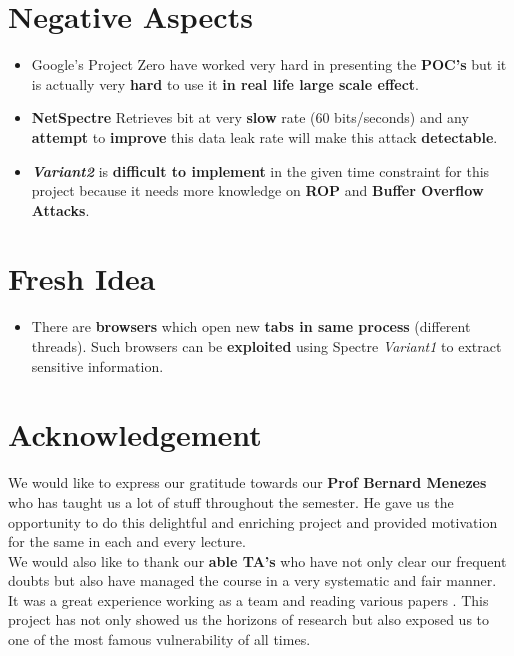 \documentclass[12pt]{article}
\begin{document}
\section{Negative Aspects}
\begin{itemize}
	\item Google's Project Zero\cite{ProjectZero} have worked very hard in presenting the \textbf{POC's} but it is actually very \textbf{hard} to use it \textbf{ in real life large scale effect}.
	\item \textbf{NetSpectre}\cite{NETSPECTRE} Retrieves bit at very \textbf{slow} rate (60 bits/seconds) and any \textbf{attempt} to \textbf{improve} this data leak rate will make this attack \textbf{detectable}.
	\item \textbf{\textit{Variant2}} is \textbf{difficult to implement} in the given time constraint for this project because it needs more knowledge on \textbf{ROP} and \textbf{Buffer Overflow Attacks}.
\end{itemize}
\section{Fresh Idea}
\begin{itemize}
	\item There are \textbf{browsers} which open new \textbf{tabs in same process} (different threads). Such browsers can be \textbf{exploited} using Spectre \textit{Variant1} to extract sensitive information.
\end{itemize}
\section{Acknowledgement}
We would like to express our gratitude towards our \textbf{Prof Bernard Menezes} who has taught us a lot of stuff throughout the semester. He gave us the opportunity to do this delightful and enriching project and provided motivation for the same in each and every lecture.\\

We would also like to thank our \textbf{able TA's} who have not only clear our frequent doubts but also have managed the course in a very systematic and fair manner.\\

It was a great experience working as a team and reading various papers . This project has not only showed us the horizons of research but also exposed us to one of the most famous vulnerability of all times.
  
\end{document}
